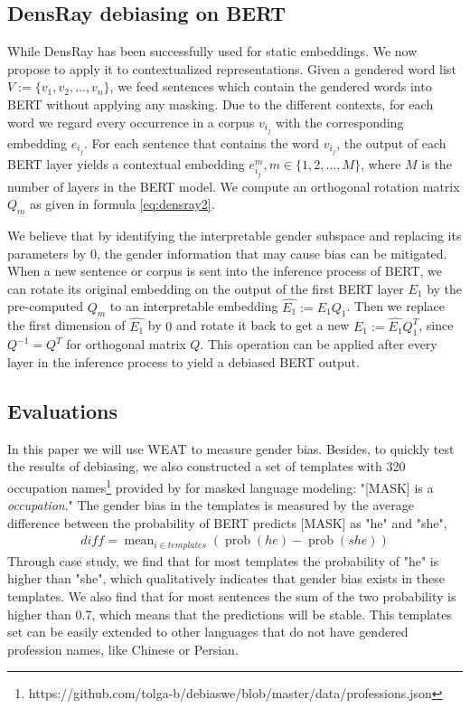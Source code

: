 \subsection{DensRay debiasing on BERT}
While DensRay has been successfully used for static embeddings. We now propose to apply it to contextualized representations. Given a gendered word list $V:=\{v_1,v_2,\dots,v_n\}$, we feed sentences which contain the gendered words into BERT without applying any masking. Due to the different contexts, for each word we regard every occurrence in a corpus $v_{i_j}$ with the corresponding embedding $e_{i_j}$. For each sentence that contains the word $v_{i_j}$, the output of each BERT layer yields a contextual embedding $e_{i_j}^m,m\in\{1,2,\dots,M\}$, where $M$ is the number of layers in the BERT model. We compute an orthogonal rotation matrix $Q_m$ as given in formula \ref{eq:densray2}. 

We believe that by identifying the interpretable gender subspace and replacing its parameters by $0$, the gender information that may cause bias can be mitigated. When a new sentence or corpus is sent into the inference process of BERT, we can rotate its original embedding on the output of the first BERT layer $E_1$ by the pre-computed $Q_m$ to an interpretable embedding $\hat{E_1}:=E_1Q_1$. Then we replace the first dimension of $\hat{E_1}$ by $0$ and rotate it back to get a new $E_1:=\hat{E_1}Q_1^T$, since $Q^{-1}=Q^T$ for orthogonal matrix $Q$. This operation can be applied after every layer in the inference process to yield a debiased BERT output. 

\subsection{Evaluations}\label{sec:eval}
In this paper we will use WEAT to measure gender bias. Besides, to quickly test the results of debiasing, we also constructed a set of templates with 320 occupation names\footnote{https://github.com/tolga-b/debiaswe/blob/master/data/professions.json} provided by \citet{bolukbasi2016man} for masked language modeling: "[MASK] is a \textit{occupation}." The gender bias in the templates is measured by the average difference between the probability of BERT predicts [MASK] as "he" and "she",
\begin{eqnarray}
    diff=\mathop{mean}_{i \in templates}(\mathop{prob}(he)-\mathop{prob}(she))\nonumber
\end{eqnarray}
Through case study, we find that for most templates the probability of "he" is higher than "she", which qualitatively indicates that gender bias exists in these templates. We also find that for most sentences the sum of the two probability is higher than 0.7, which means that the predictions will be stable. This templates set can be easily extended to other languages that do not have gendered profession names, like Chinese or Persian.
